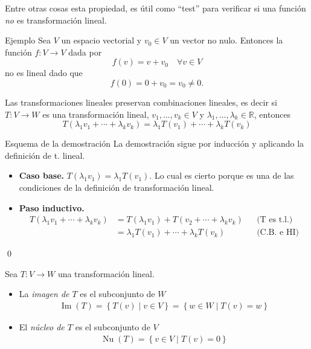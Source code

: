 \documentclass{beamer} %
\newcommand{\img}{\operatorname{Im}}
\renewcommand\nu{\operatorname{Nu}}
\newcommand{\R}{\mathbb R}
\begin{document}
\begin{frame}

Entre otras cosas esta propiedad, es útil como ``test'' para verificar si una función \textit{no} es transformación lineal. 
\pause
\
\begin{exampleblock}{Ejemplo}
Sea $V$ un espacio vectorial y $v_0\in V$ un vector no nulo. Entonces la función $f:V\longrightarrow V$ dada por 
$$
f(v)=v+v_0\quad\forall v\in V
$$
no es lineal dado que
$$
f(0)=0+v_0=v_0\neq0.
$$
\end{exampleblock}


\end{frame}

\begin{frame}
\begin{observacion}
Las transformaciones lineales preservan combinaciones lineales, es decir si $T:V\longrightarrow W$ es una transformación lineal, $v_1, ..., v_k\in V$ y $\lambda_1, ..., \lambda_k\in\R$, entonces
$$
T(\lambda_1v_1+\cdots+\lambda_kv_k)=\lambda_1T(v_1)+\cdots+\lambda_kT(v_k)
$$
\end{observacion}\pause
\begin{block}{Esquema de la demostración}\pause
    La demostración sigue por inducción y aplicando la definición de t. lineal. 
\begin{itemize}
    \item \textbf{Caso base.}  $T(\lambda_1v_1)=\lambda_1T(v_1)$. Lo cual es cierto porque es una de las condiciones de la definición de transformación lineal.
    \item \textbf{Paso inductivo.} 
    \begin{align*}
        T(\lambda_1v_1+\cdots+\lambda_kv_k) &= T(\lambda_1v_1)+T(v_2+\cdots+\lambda_kv_k)&&\text{(T es t.l.)}\\
        &=  \lambda_1T(v_1)+\cdots+\lambda_kT(v_k)&&\text{(C.B. e HI)}
    \end{align*}
\end{itemize}
\qed
\end{block}

\end{frame}




\begin{frame}
\begin{definicion}
Sea $T:V\longrightarrow W$ una transformación lineal.
\begin{itemize}\pause
\item La \textit{imagen de $T$} es el subconjunto de $W$
 \begin{align*}
 \img(T)=\left\{T(v)\mid v\in V\right\}=\left\{w\in W\mid T(v)=w\right\}
 \end{align*}\pause
 \item El \textit{núcleo de $T$} es el subconjunto de $V$
 \begin{align*}
 \nu(T)=\left\{v\in V\mid T(v)=0\right\}
 \end{align*}
\end{itemize}
\end{definicion}
\end{frame}
\end{document}
